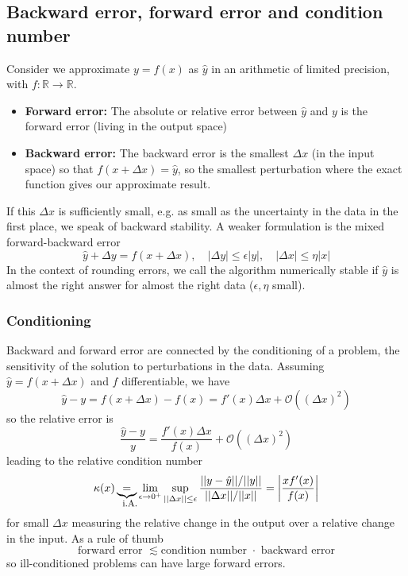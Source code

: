 \subsection{Backward error, forward error and condition number}
Consider we approximate $y=f(x)$ as $\hat{y}$ in an arithmetic of limited precision, with $f: \mathbb{R} \rightarrow \mathbb{R}$.
\begin{itemize}
    \item \textbf{Forward error:} The absolute or relative error between $\hat{y}$ and $y$ is the forward error (living in the output space)
    \item \textbf{Backward error:} The backward error is the smallest $\Delta x$ (in the input space) so that $f(x+\Delta x) = \hat{y}$, so the smallest perturbation where the exact function gives our approximate result.
\end{itemize}
If this $\Delta x$ is sufficiently small, e.g. as small as the uncertainty in the data in the first place, we speak
of backward stability. A weaker formulation is the mixed forward-backward error
\begin{equation}
    \hat{y} + \Delta y = f(x + \Delta x), \quad |\Delta y| \leq \epsilon |y|, \quad |\Delta x| \leq \eta |x|
\end{equation}
In the context of rounding errors, we call the algorithm numerically stable if $\hat{y}$ is almost the right answer for
almost the right data ($\epsilon,\eta$ small).
\subsubsection{Conditioning}
Backward and forward error are connected by the conditioning of a problem, the sensitivity of the
solution to perturbations in the data. Assuming $\hat{y} = f(x + \Delta x)$ and $f$ differentiable, we have
\begin{equation}
    \hat{y} - y = f(x + \Delta x) - f(x) = f'(x) \Delta x + \mathcal{O}((\Delta x)^2)
\end{equation}
so the relative error is
\begin{equation}
    \frac{\hat{y} - y}{y} = \frac{f'(x) \Delta x}{f(x)} + \mathcal{O}((\Delta x)^2)
\end{equation}
leading to the relative condition number
\begin{equation}
    \kappa(x) \explain{=}{i.A.} \lim_{\epsilon \rightarrow 0^+} \sup_{||\Delta x|| \leq \epsilon} \frac{||y-\hat{y}|| / ||y||}{||\Delta x|| / ||x||} = \left| \frac{x f'(x)}{f(x)} \right|
\end{equation}
for small $\Delta x$ measuring the relative change in the output over a relative change in the input.
As a rule of thumb
\begin{equation}
    \text{forward error } \lesssim \text{condition number } \cdot \text{ backward error}
\end{equation}
so ill-conditioned problems can have large forward errors.

